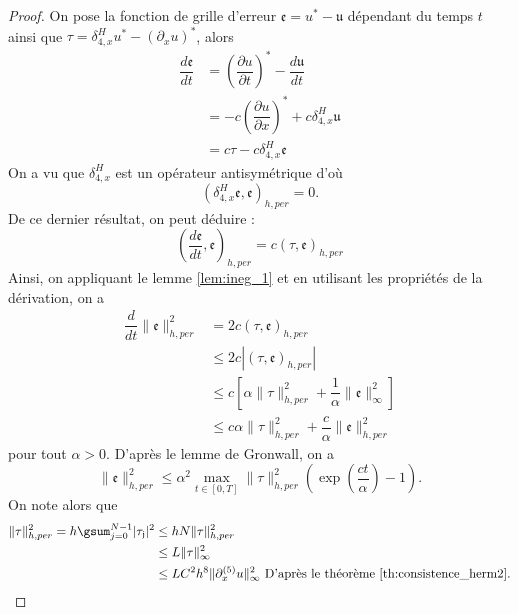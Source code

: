 \begin{proof}
On pose la fonction de grille d'erreur $\mathfrak{e} = u^* - \mathfrak{u}$ dépendant du temps $t$ ainsi que $\mathfrak{\tau} = \delta_{4,x}^H u^* - (\partial_x u)^*$, alors
\begin{align*}
\dfrac{d \mathfrak{e}}{dt} & = \left(\dfrac{\partial u}{\partial t}\right)^* - \dfrac{d \mathfrak{u}}{dt} \\
	& = - c \left( \dfrac{\partial u}{\partial x} \right)^* + c \delta_{4,x}^H \mathfrak{u} \\
	& = c \mathfrak{\tau} - c \delta_{4,x}^H \mathfrak{e}
\end{align*}
On a vu que $\delta_{4,x}^H$ est un opérateur antisymétrique d'où
\begin{equation}
( \delta_{4,x}^H \mathfrak{e}, \mathfrak{e} )_{h,per} = 0.
\end{equation}
De ce dernier résultat, on peut déduire :
\begin{equation}
( \dfrac{d \mathfrak{e}}{dt} , \mathfrak{e} )_{h,per} = c ( \mathfrak{\tau}, \mathfrak{e})_{h,per}
\end{equation}
Ainsi, on appliquant le lemme \ref{lem:ineg_1} et en utilisant les propriétés de la dérivation, on a
\begin{align*}
\dfrac{d}{dt} \|\mathfrak{e}\|_{h,per}^2 & = 2 c ( \mathfrak{\tau}, \mathfrak{e})_{h,per} \\
   & \leq 2 c |( \mathfrak{\tau}, \mathfrak{e})_{h,per}| \\
   & \leq c \left[ \alpha \|\mathfrak{\tau}\|_{h,per}^2 + \dfrac{1}{\alpha} \|\mathfrak{e}\|_{\infty}^2 \right] \\
   & \leq c \alpha \|\mathfrak{\tau}\|^2_{h,per} + \dfrac{c}{\alpha} \|\mathfrak{e}\|^2_{h,per} 
\end{align*}
pour tout $\alpha > 0$.
D'après le lemme de Gronwall, on a
\begin{equation}
\|\mathfrak{e}\|_{h,per}^2 \leq \alpha^2 \max_{t \in [0,T]} \|\mathfrak{\tau}\|_{h,per}^2   \left( \exp \left( \dfrac{ct}{\alpha} \right) -1  \right).
\end{equation}
On note alors que
\begin{align*}
\|\mathfrak{\tau}\|_{h,per}^2 = h \gsum_{j=0}^{N-1} |\mathfrak{\tau_j}|^2 & \leq h N \|\mathfrak{\tau}\|_{h,per}^2 \\
	& \leq  L \|\mathfrak{\tau}\|_{\infty}^2 \\
	& \leq L C^2 h^8  \| \partial_x^{(5)} u \|_{\infty}^2 \text{ D'après le théorème \ref{th:consistence_herm2}.}

\end{align*}
\end{proof}
